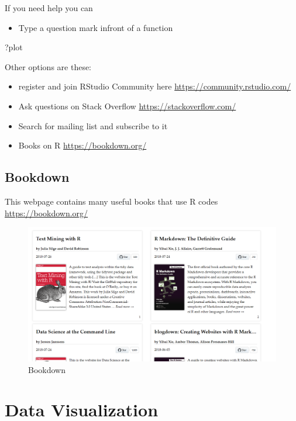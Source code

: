 \documentclass[
]{book}
\makeatletter
\newenvironment{Shaded}{\begin{snugshade}}{\end{snugshade}}
\newcommand{\NormalTok}[1]{#1}
\providecommand{\tightlist}{%
  \setlength{\itemsep}{0pt}\setlength{\parskip}{0pt}}
\newenvironment{kframe}{%
\medskip{}
\setlength{\fboxsep}{.8em}
 \def\at@end@of@kframe{}%
 \ifinner\ifhmode%
  \def\at@end@of@kframe{\end{minipage}}%
  \begin{minipage}{\columnwidth}%
 \fi\fi%
 \def\FrameCommand##1{\hskip\@totalleftmargin \hskip-\fboxsep
 \colorbox{shadecolor}{##1}\hskip-\fboxsep
     \hskip-\linewidth \hskip-\@totalleftmargin \hskip\columnwidth}%
 \MakeFramed {\advance\hsize-\width
   \@totalleftmargin\z@ \linewidth\hsize
   \@setminipage}}%
 {\par\unskip\endMakeFramed%
 \at@end@of@kframe}
\renewenvironment{Shaded}{\begin{kframe}}{\end{kframe}}
\makeatother
\begin{document}
If you need help you can

\begin{itemize}
\tightlist
\item
  Type a question mark infront of a function
\end{itemize}

\begin{Shaded}
\begin{Highlighting}[]
\NormalTok{?plot}
\end{Highlighting}
\end{Shaded}

Other options are these:

\begin{itemize}
\tightlist
\item
  register and join RStudio Community here \url{https://community.rstudio.com/}
\item
  Ask questions on Stack Overflow \url{https://stackoverflow.com/}
\item
  Search for mailing list and subscribe to it
\item
  Books on R \url{https://bookdown.org/}
\end{itemize}

\hypertarget{bookdown}{%
\section{Bookdown}\label{bookdown}}

This webpage contains many useful books that use R codes \url{https://bookdown.org/}

\begin{figure}
\centering
\includegraphics{bookdown.PNG}
\caption{Bookdown}
\end{figure}

\hypertarget{data-visualization}{%
\chapter{Data Visualization}\label{data-visualization}}
\end{document}
